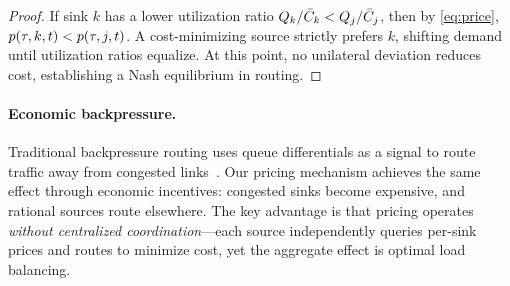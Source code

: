 \begin{proof}
If sink $k$ has a lower utilization ratio $Q_k/\bar{C}_k < Q_j/\bar{C}_j$,
then by \eqref{eq:price}, $p(\tau, k, t) < p(\tau, j, t)$.
A cost-minimizing source strictly prefers $k$, shifting demand until
utilization ratios equalize. At this point, no unilateral deviation reduces
cost, establishing a Nash equilibrium in routing.
\end{proof}

\paragraph{Economic backpressure.}
Traditional backpressure routing uses queue differentials as a signal to route
traffic away from congested links~\cite{tassiulas1992stability}. Our pricing
mechanism achieves the same effect through economic incentives: congested sinks
become expensive, and rational sources route elsewhere. The key advantage is
that pricing operates \emph{without centralized coordination}---each source
independently queries per-sink prices and routes to minimize cost, yet the
aggregate effect is optimal load balancing.
